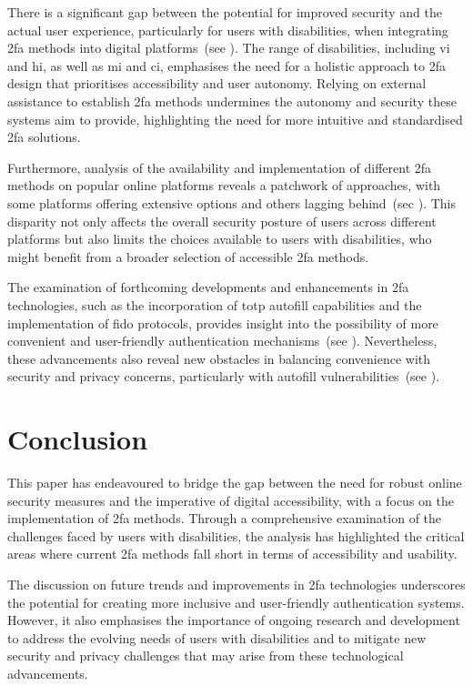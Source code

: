 There is a significant gap between the potential for improved security and the actual user experience, particularly for users with disabilities, when integrating \ac{2fa} methods into digital platforms~(see ). The range of disabilities, including \ac{vi} and \ac{hi}, as well as \ac{mi} and \ac{ci}, emphasises the need for a holistic approach to \ac{2fa} design that prioritises accessibility and user autonomy. Relying on external assistance to establish \ac{2fa} methods undermines the autonomy and security these systems aim to provide, highlighting the need for more intuitive and standardised \ac{2fa} solutions.

Furthermore, analysis of the availability and implementation of different \ac{2fa} methods on popular online platforms reveals a patchwork of approaches, with some platforms offering extensive options and others lagging behind~(sec ). This disparity not only affects the overall security posture of users across different platforms but also limits the choices available to users with disabilities, who might benefit from a broader selection of accessible \ac{2fa} methods.

The examination of forthcoming developments and enhancements in \ac{2fa} technologies, such as the incorporation of \ac{totp} autofill capabilities and the implementation of \ac{fido} protocols, provides insight into the possibility of more convenient and user-friendly authentication mechanisms~(see ). Nevertheless, these advancements also reveal new obstacles in balancing convenience with security and privacy concerns, particularly with autofill vulnerabilities~(see ).

\section{Conclusion}
\label{sec:conclusion}

This paper has endeavoured to bridge the gap between the need for robust online security measures and the imperative of digital accessibility, with a focus on the implementation of \ac{2fa} methods. Through a comprehensive examination of the challenges faced by users with disabilities, the analysis has highlighted the critical areas where current \ac{2fa} methods fall short in terms of accessibility and usability.

The discussion on future trends and improvements in \ac{2fa} technologies underscores the potential for creating more inclusive and user-friendly authentication systems. However, it also emphasises the importance of ongoing research and development to address the evolving needs of users with disabilities and to mitigate new security and privacy challenges that may arise from these technological advancements.

